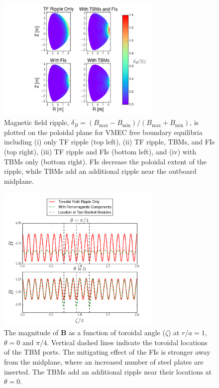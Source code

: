 \documentclass[aip, pop, preprint]{revtex4-1}
\numberwithin{figure}{section}
\numberwithin{equation}{section}
\begin{document}
\begin{figure}[h!]
\centering
\includegraphics[width=0.7\textwidth]{ripplecontour.png}
\caption{\label{fig:ripplecontour} Magnetic field ripple, $\delta_B = (B_{\text{max}}-B_{\text{min}})/(B_{\text{max}} + B_{\text{min}})$, is plotted on the poloidal plane for VMEC free boundary equilibria including (i) only TF ripple (top left), (ii) TF ripple, TBMs, and FIs (top right), (iii) TF ripple and FIs (bottom left), and (iv) with TBMs only (bottom right). FIs decrease the poloidal extent of the ripple, while TBMs add an additional ripple near the outboard midplane.}
\end{figure}

\begin{figure}[h!]
\centering
\includegraphics[width=0.7\textwidth]{toroidalripple.png}
\caption{\label{fig:toroidalripple} The magnitude of $\bm{B}$ as a function of toroidal angle ($\zeta$) at $r/a = 1$, $\theta = 0$ and $\pi/4$. Vertical dashed lines indicate the toroidal locations of the TBM ports. The mitigating effect of the FIs is stronger away from the midplane, where an increased number of steel plates are inserted. The TBMs add an additional ripple near their locations at $\theta = 0$. }
\end{figure}
\end{document}
